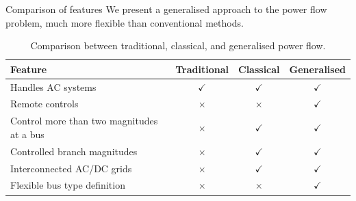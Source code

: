 \begin{frame}{Comparison of features}
    We present a generalised approach to the power flow problem, much more flexible than conventional methods.
    
    \begin{table}[htbp]
    \centering
    \begin{tabular}{|l|c|c|c|}
    \hline
    \textbf{Feature} & \textbf{Traditional} & \textbf{Classical} & \textbf{Generalised} \\ \hline
    Handles AC systems & \(\checkmark\) & \(\checkmark\) & \(\checkmark\) \\ \hline
    Remote controls & \(\times\) & \(\times\) & \(\checkmark\) \\ \hline
    Control more than two magnitudes at a bus & \(\times\) & \(\checkmark\) & \(\checkmark\) \\ \hline
    Controlled branch magnitudes & \(\times\) & \(\checkmark\) & \(\checkmark\) \\ \hline
    Interconnected AC/DC grids & \(\times\) & \(\checkmark\) & \(\checkmark\) \\ \hline
    Flexible bus type definition & \(\times\) & \(\times\) & \(\checkmark\) \\ \hline
    \end{tabular}
    \caption{Comparison between traditional, classical, and generalised power flow.}
    \label{tab:generalisedPfFeatures}
    \end{table}
\end{frame}





